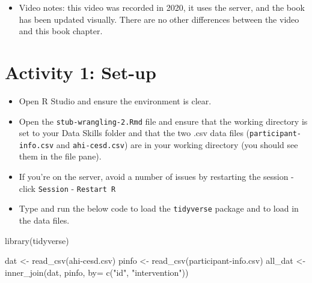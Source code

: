 \documentclass[
  oneside]{book}
\newenvironment{Shaded}{\begin{snugshade}}{\end{snugshade}}
\newcommand{\AttributeTok}[1]{\textcolor[rgb]{0.77,0.63,0.00}{#1}}
\newcommand{\FunctionTok}[1]{\textcolor[rgb]{0.00,0.00,0.00}{#1}}
\newcommand{\NormalTok}[1]{#1}
\newcommand{\OtherTok}[1]{\textcolor[rgb]{0.56,0.35,0.01}{#1}}
\newcommand{\StringTok}[1]{\textcolor[rgb]{0.31,0.60,0.02}{#1}}
\providecommand{\tightlist}{%
  \setlength{\itemsep}{0pt}\setlength{\parskip}{0pt}}
\begin{document}
\begin{itemize}
\tightlist
\item
  Video notes: this video was recorded in 2020, it uses the server, and the book has been updated visually. There are no other differences between the video and this book chapter.
\end{itemize}

\hypertarget{activity-1-set-up-2}{%
\section{Activity 1: Set-up}\label{activity-1-set-up-2}}

\begin{itemize}
\tightlist
\item
  Open R Studio and ensure the environment is clear.\\
\item
  Open the \texttt{stub-wrangling-2.Rmd} file and ensure that the working directory is set to your Data Skills folder and that the two .csv data files (\texttt{participant-info.csv} and \texttt{ahi-cesd.csv}) are in your working directory (you should see them in the file pane).\\
\item
  If you're on the server, avoid a number of issues by restarting the session - click \texttt{Session} - \texttt{Restart\ R}\\
\item
  Type and run the below code to load the \texttt{tidyverse} package and to load in the data files.
\end{itemize}

\begin{Shaded}
\begin{Highlighting}[]
\FunctionTok{library}\NormalTok{(tidyverse) }

\NormalTok{dat }\OtherTok{\textless{}{-}} \FunctionTok{read\_csv}\NormalTok{(}\StringTok{\textquotesingle{}ahi{-}cesd.csv\textquotesingle{}}\NormalTok{)}
\NormalTok{pinfo }\OtherTok{\textless{}{-}} \FunctionTok{read\_csv}\NormalTok{(}\StringTok{\textquotesingle{}participant{-}info.csv\textquotesingle{}}\NormalTok{)}
\NormalTok{all\_dat }\OtherTok{\textless{}{-}} \FunctionTok{inner\_join}\NormalTok{(dat, pinfo, }\AttributeTok{by=} \FunctionTok{c}\NormalTok{(}\StringTok{"id"}\NormalTok{, }\StringTok{"intervention"}\NormalTok{))}
\end{Highlighting}
\end{Shaded}
\end{document}
